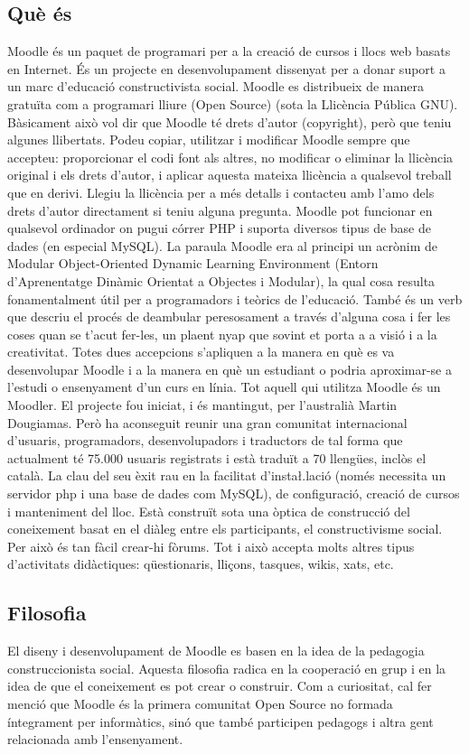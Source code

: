 \documentclass[a4paper]{report}  %
\begin{document}
\subsection{Què és}
Moodle és un paquet de programari per a la creació de cursos i llocs web basats en Internet. És un projecte en desenvolupament dissenyat per a donar suport a un marc d'educació constructivista social. 
Moodle es distribueix de manera gratuïta com a programari lliure (Open Source) (sota la Llicència Pública GNU). Bàsicament això vol dir que Moodle té drets d'autor (copyright), però que teniu algunes llibertats. Podeu copiar, utilitzar i modificar Moodle sempre que accepteu: proporcionar el codi font als altres, no modificar o eliminar la llicència original i els drets d'autor, i aplicar aquesta mateixa llicència a qualsevol treball que en derivi. Llegiu la llicència per a més detalls i contacteu amb l'amo dels drets d'autor directament si teniu alguna pregunta. 
Moodle pot funcionar en qualsevol ordinador on pugui córrer PHP i suporta diversos tipus de base de dades (en especial MySQL). 
La paraula Moodle era al principi un acrònim de Modular Object-Oriented Dynamic Learning Environment (Entorn d'Aprenentatge Dinàmic Orientat a Objectes i Modular), la qual cosa resulta fonamentalment útil per a programadors i teòrics de l'educació. També és un verb que descriu el procés de deambular peresosament a través d'alguna cosa i fer les coses quan se t'acut fer-les, un plaent nyap que sovint et porta a a visió i a la creativitat. Totes dues accepcions s'apliquen a la manera en què es va desenvolupar Moodle i a la manera en què un estudiant o podria aproximar-se a l'estudi o ensenyament d'un curs en línia. Tot aquell qui utilitza Moodle és un Moodler. 
El projecte fou iniciat, i és mantingut, per l'australià Martin Dougiamas. Però ha aconseguit reunir una gran comunitat internacional d'usuaris, programadors, desenvolupadors i traductors de tal forma que actualment té 75.000 usuaris registrats i està traduït a 70 llengües, inclòs el català.
La clau del seu èxit rau en la facilitat d'insta\l.lació (només necessita un servidor php i una base de dades com MySQL), de configuració, creació de cursos i manteniment del lloc. Està construït sota una òptica de construcció del coneixement basat en el diàleg entre els participants, el constructivisme social. Per això és tan fàcil crear-hi fòrums. Tot i això accepta molts altres tipus d'activitats didàctiques: qüestionaris, lliçons, tasques, wikis, xats, etc.
\subsection{Filosofia}
 El diseny i desenvolupament de Moodle es basen en la idea de la pedagogia construccionista social. Aquesta filosofia radica en la cooperació en grup i en la idea de que el coneixement es pot crear o construir.
Com a curiositat, cal fer menció que Moodle és la primera comunitat Open Source no formada íntegrament per informàtics, sinó que també participen pedagogs i altra gent relacionada amb l'ensenyament.
\end{document}
